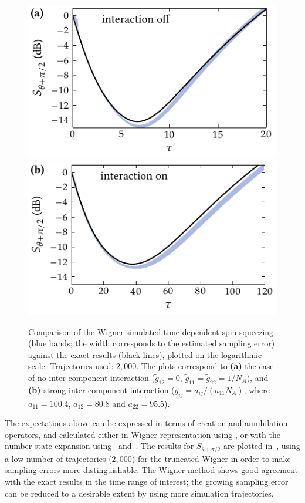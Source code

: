 \begin{figure}
    \centerline{%
    \includegraphics{figures_generated/exact/squeezing_nocc_100.pdf}%
    \includegraphics{figures_generated/exact/squeezing_cc_100.pdf}}

    \caption[Comparison of Wigner simulated spin squeezing with an exact method]{
    Comparison of the Wigner simulated time-dependent spin squeezing (blue bands; the width corresponds to the estimated sampling error) against the exact results (black lines), plotted on the logarithmic scale.
    Trajectories used: $2,000$.
    The plots correspond to \textbf{(a)} the case of no inter-component interaction ($\tilde{g}_{12} = 0$, $\tilde{g}_{11} = \tilde{g}_{22} = 1 / N_A$), and \textbf{(b)} strong inter-component interaction ($\tilde{g}_{ij} = a_{ij} / (a_{11} N_A)$, where $a_{11} = 100.4$, $a_{12} = 80.8$ and $a_{22} = 95.5$).}%

    \label{fig:exact:squeezing-comparison}
\end{figure}

The expectations above can be expressed in terms of creation and annihilation operators, and calculated either in Wigner representation using , or with the number state expansion using~ and~.
The results for $S_{\theta+\pi/2}$ are plotted in~, using a low number of trajectories ($2,000$) for the truncated Wigner in order to make sampling errors more distinguishable.
The Wigner method shows good agreement with the exact results in the time range of interest; the growing sampling error can be reduced to a desirable extent by using more simulation trajectories.

